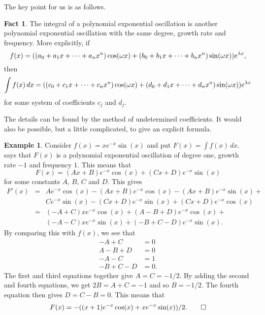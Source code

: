 \documentclass[a4paper]{book}
\theoremstyle{definition}
\newtheorem{fact}[theorem]{Fact}
\newtheorem{example}[theorem]{Example}
\begin{document}
The key point for us is as follows.
\begin{fact}
 The integral of a polynomial exponential oscillation is another
 polynomial exponential oscillation with the same degree, growth rate
 and frequency.  More explicitly, if 
 \[ f(x)= ((a_0+a_1x+\dotsb+a_nx^n)\cos(\omega x) + 
           (b_0+b_1x+\dotsb+b_nx^n)\sin(\omega x)) e^{\lambda x},
 \]
 then
 \[ \int f(x)\, dx 
        = ((c_0+c_1x+\dotsb+c_nx^n)\cos(\omega x) + 
           (d_0+d_1x+\dotsb+d_nx^n)\sin(\omega x)) e^{\lambda x}
 \]
 for some system of coefficients $c_j$ and $d_j$.

 The details can be found by the method of
 undetermined coefficients.  It would also be possible, but a little
 complicated, to give an explicit formula.
\end{fact}
\begin{example}
 Consider $f(x)=xe^{-x}\sin(x)$ and put $F(x)=\int f(x)\,dx$.  
  says that $F(x)$ is a polynomial
 exponential oscillation of degree one, growth rate $-1$ and frequency
 $1$.  This means that 
 \[ F(x) = (Ax+B)e^{-x}\cos(x) + (Cx+D)e^{-x}\sin(x) \]
 for some constants $A$, $B$, $C$ and $D$.  This gives
 \begin{eqnarray*}
  F'(x)
  &=& Ae^{-x}\cos(x) - (Ax+B)e^{-x}\cos(x) - (Ax+B)e^{-x}\sin(x) + \\
  &&  Ce^{-x}\sin(x) - (Cx+D)e^{-x}\sin(x) + (Cx+D)e^{-x}\cos(x) \\
  &=& (-A+C)xe^{-x}\cos(x) + (A-B+D)e^{-x}\cos(x) + \\
  &&  (-A-C)xe^{-x}\sin(x) + (-B+C-D)e^{-x}\sin(x).
 \end{eqnarray*}
 By comparing this with $f(x)$, we see that
 \begin{align*}
  -A+C &= 0 \\
  A-B+D &= 0 \\
  -A-C &= 1 \\
  -B+C-D &= 0.
 \end{align*}
 The first and third equations together give $A=C=-1/2$.  By adding
 the second and fourth equations, we get $2B=A+C=-1$ and so $B=-1/2$.
 The fourth equation then gives $D=C-B=0$.  This means that 
 \[ F(x) = -((x+1)e^{-x}\cos(x) + xe^{-x}\sin(x))/2. \qed \]
\end{example}
\end{document}
